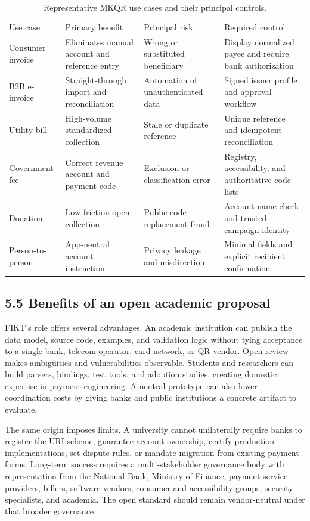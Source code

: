 \begin{table}
\caption{Representative MKQR use cases and their principal controls.}
\begin{tabular}{llll}
Use case & Primary benefit & Principal risk & Required control \\
Consumer invoice & Eliminates manual account and reference entry & Wrong or substituted beneficiary & Display normalized payee and require bank authorization \\
B2B e-invoice & Straight-through import and reconciliation & Automation of unauthenticated data & Signed issuer profile and approval workflow \\
Utility bill & High-volume standardized collection & Stale or duplicate reference & Unique reference and idempotent reconciliation \\
Government fee & Correct revenue account and payment code & Exclusion or classification error & Registry, accessibility, and authoritative code lists \\
Donation & Low-friction open collection & Public-code replacement fraud & Account-name check and trusted campaign identity \\
Person-to-person & App-neutral account instruction & Privacy leakage and misdirection & Minimal fields and explicit recipient confirmation \\
\end{tabular}
\end{table}

\subsection{5.5 Benefits of an open academic proposal}

FIKT's role offers several advantages. An academic institution can publish the data model, source code, examples, and validation logic without tying acceptance to a single bank, telecom operator, card network, or QR vendor. Open review makes ambiguities and vulnerabilities observable. Students and researchers can build parsers, bindings, test tools, and adoption studies, creating domestic expertise in payment engineering. A neutral prototype can also lower coordination costs by giving banks and public institutions a concrete artifact to evaluate.

The same origin imposes limits. A university cannot unilaterally require banks to register the URI scheme, guarantee account ownership, certify production implementations, set dispute rules, or mandate migration from existing payment forms. Long-term success requires a multi-stakeholder governance body with representation from the National Bank, Ministry of Finance, payment service providers, billers, software vendors, consumer and accessibility groups, security specialists, and academia. The open standard should remain vendor-neutral under that broader governance.


